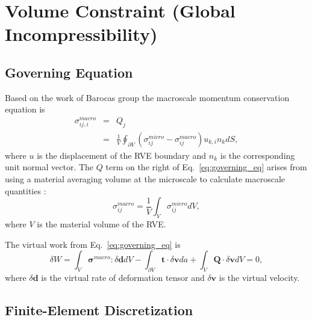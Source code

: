 \chapter{Volume Constraint (Global Incompressibility)}

\section{Governing Equation}
Based on the work of Barocas group \cite{Chandran:2007hy,Stylianopoulos:2007dp} the macroscale momentum conservation equation is
%
\begin{eqnarray}
\sigma^{macro}_{ij,i} &=& Q_j \nonumber\\
%
&=&\frac{1}{V} \oint_{\partial V} \left( \sigma^{micro}_{ij} - \sigma^{macro}_{ij} \right)u_{k,i}n_k dS,
\label{eq:governing_eq}
\end{eqnarray}
%
where $u$ is the displacement of the RVE boundary and $n_k$ is the corresponding unit normal vector. The $Q$ term on the right of Eq.\ \eqref{eq:governing_eq} arises from using a material averaging volume at the microscale to calculate macroscale quantities \cite{Chandran:2007hy}:
%
\begin{equation}
\sigma_{ij}^{macro} = \frac{1}{V}\int_{V}\sigma_{ij}^{micro} dV,
\end{equation}
%
where $V$ is the material volume of the RVE.

The virtual work from Eq.\ \eqref{eq:governing_eq} is \cite{JavierBonet:2008uxa}
%
\begin{equation}
\delta W = \int_V \pmb{\sigma}^{macro} : \delta\pmb{d} dV - \int_{\partial V} \pmb{t} \cdot \delta \pmb{v} da + \int_V \pmb{Q} \cdot \delta \pmb{v} dV = 0,
\label{eq:weak_form}
\end{equation}
%
where $\delta \pmb{d}$ is the virtual rate of deformation tensor and $\delta \pmb{v}$ is the virtual velocity.

\section{Finite-Element Discretization}

